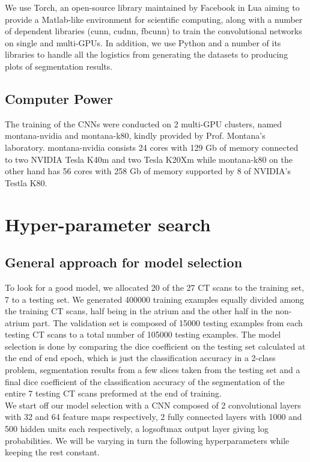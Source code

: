 We use Torch, an open-source library maintained by Facebook in Lua aiming to provide a Matlab-like environment for scientific computing, along with a number of dependent libraries (cunn, cudnn, fbcunn) to train the convolutional networks on single and multi-GPUs. In addition, we use Python and a number of its libraries to handle all the logistics from generating the datasets to producing plots of segmentation results.

\subsection{Computer Power}

The training of the CNNs were conducted on 2 multi-GPU clusters, named montana-nvidia and montana-k80, kindly provided by Prof. Montana's laboratory. montana-nvidia consists 24 cores with 129 Gb of memory connected to two NVIDIA Tesla K40m and two Tesla K20Xm while montana-k80 on the other hand has 56 cores with 258 Gb of memory supported by 8 of NVIDIA's Testla K80. 

\section{Hyper-parameter search}

\subsection{General approach for model selection}

To look for a good model, we allocated 20 of the 27 CT scans to the training set, 7 to a testing set. We generated 400000 training examples equally divided among the training CT scans, half being in the atrium and the other half in the non-atrium part. The validation set is composed of 15000 testing examples from each testing CT scans to a total number of 105000 testing examples. The model selection is done by comparing the dice coefficient on the testing set calculated at the end of end epoch, which is just the classification accuracy in a 2-class problem, segmentation results from a few slices taken from the testing set and a final dice coefficient of the classification accuracy of the segmentation of the entire 7 testing CT scans preformed at the end of training.\\

We start off our model selection with a CNN composed of 2 convolutional layers with 32 and 64 feature maps respectively, 2 fully connected layers with 1000 and 500 hidden units each respectively, a logsoftmax output layer giving log probabilities. We will be varying in turn the following hyperparameters while keeping the rest constant.\\

